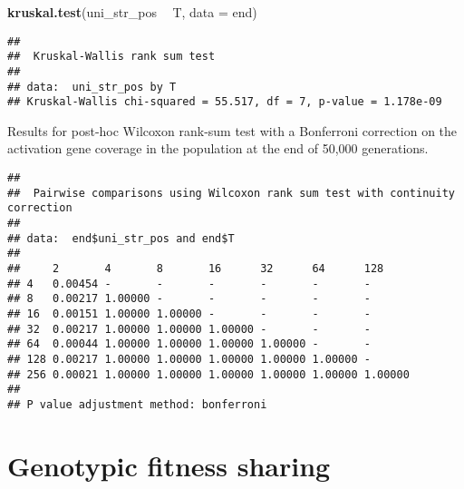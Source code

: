 \documentclass[]{book}
\newenvironment{Shaded}{\begin{snugshade}}{\end{snugshade}}
\newcommand{\DataTypeTok}[1]{\textcolor[rgb]{0.13,0.29,0.53}{#1}}
\newcommand{\KeywordTok}[1]{\textcolor[rgb]{0.13,0.29,0.53}{\textbf{#1}}}
\newcommand{\NormalTok}[1]{#1}
\newcommand{\OperatorTok}[1]{\textcolor[rgb]{0.81,0.36,0.00}{\textbf{#1}}}
\newcommand{\OtherTok}[1]{\textcolor[rgb]{0.56,0.35,0.01}{#1}}
\newcommand{\StringTok}[1]{\textcolor[rgb]{0.31,0.60,0.02}{#1}}
\begin{document}
\begin{Shaded}
\begin{Highlighting}[]
\KeywordTok{kruskal.test}\NormalTok{(uni_str_pos }\OperatorTok{~}\StringTok{ }\NormalTok{T, }\DataTypeTok{data =}\NormalTok{ end)}
\end{Highlighting}
\end{Shaded}

\begin{verbatim}
## 
##  Kruskal-Wallis rank sum test
## 
## data:  uni_str_pos by T
## Kruskal-Wallis chi-squared = 55.517, df = 7, p-value = 1.178e-09
\end{verbatim}

Results for post-hoc Wilcoxon rank-sum test with a Bonferroni correction on the activation gene coverage in the population at the end of 50,000 generations.

\begin{Shaded}
\end{Shaded}

\begin{verbatim}
## 
##  Pairwise comparisons using Wilcoxon rank sum test with continuity correction 
## 
## data:  end$uni_str_pos and end$T 
## 
##     2       4       8       16      32      64      128    
## 4   0.00454 -       -       -       -       -       -      
## 8   0.00217 1.00000 -       -       -       -       -      
## 16  0.00151 1.00000 1.00000 -       -       -       -      
## 32  0.00217 1.00000 1.00000 1.00000 -       -       -      
## 64  0.00044 1.00000 1.00000 1.00000 1.00000 -       -      
## 128 0.00217 1.00000 1.00000 1.00000 1.00000 1.00000 -      
## 256 0.00021 1.00000 1.00000 1.00000 1.00000 1.00000 1.00000
## 
## P value adjustment method: bonferroni
\end{verbatim}

\hypertarget{genotypic-fitness-sharing}{%
\chapter{Genotypic fitness sharing}\label{genotypic-fitness-sharing}}
\end{document}

